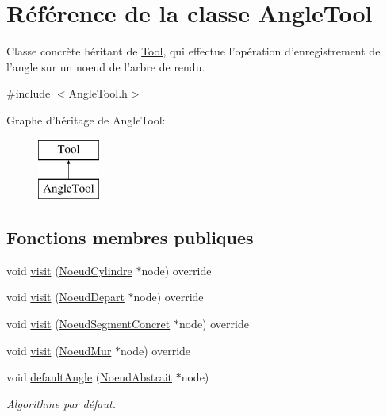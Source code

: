 \hypertarget{class_angle_tool}{\section{Référence de la classe Angle\-Tool}
\label{class_angle_tool}
}


Classe concrète héritant de \hyperlink{class_tool}{Tool}, qui effectue l'opération d'enregistrement de l'angle sur un noeud de l'arbre de rendu.  




{\ttfamily \#include $<$Angle\-Tool.\-h$>$}

Graphe d'héritage de Angle\-Tool\-:\begin{figure}[H]
\begin{center}
\leavevmode
\includegraphics[height=2.000000cm]{class_angle_tool}
\end{center}
\end{figure}
\subsection*{Fonctions membres publiques}
\begin{DoxyCompactItemize}
\item 
void \hyperlink{group__inf2990_ga925fee2b000babaae1c7947a732a0bba}{visit} (\hyperlink{class_noeud_cylindre}{Noeud\-Cylindre} $\ast$node) override
\item 
void \hyperlink{group__inf2990_gaaa2fc24bde51948c2288c375f19d70ae}{visit} (\hyperlink{class_noeud_depart}{Noeud\-Depart} $\ast$node) override
\item 
void \hyperlink{group__inf2990_ga0209990747f5f623c71076c02a3ed018}{visit} (\hyperlink{class_noeud_segment_concret}{Noeud\-Segment\-Concret} $\ast$node) override
\item 
void \hyperlink{group__inf2990_ga5bf124eb8955a829e87743cc6a737b49}{visit} (\hyperlink{class_noeud_mur}{Noeud\-Mur} $\ast$node) override
\item 
void \hyperlink{group__inf2990_gac864ba35d8073ed9564a0a90d4df351d}{default\-Angle} (\hyperlink{class_noeud_abstrait}{Noeud\-Abstrait} $\ast$node)
\begin{DoxyCompactList}\small\item\em Algorithme par défaut. \end{DoxyCompactList}\end{DoxyCompactItemize}


